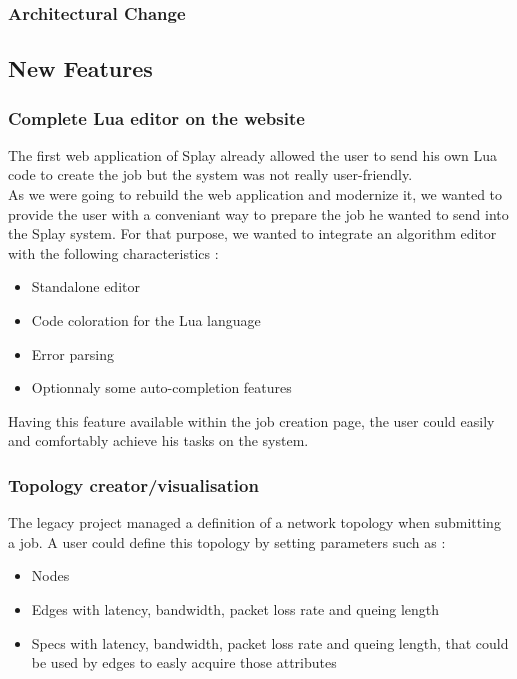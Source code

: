 \documentclass{eplmastersthesis}
\begin{document}
        \subsubsection{Architectural Change}




      \subsection{New Features}

        \subsubsection{Complete Lua editor on the website}

          The first web application of Splay already allowed the user to send
          his own Lua code to create the job but the system was not really
          user-friendly.\\

          As we were going to rebuild the web application and modernize it,
          we wanted to provide the user with a conveniant way to prepare
          the job he wanted to send into the Splay system. For that purpose,
          we wanted to integrate an algorithm editor with the following
          characteristics :

          \begin{itemize}
            \item Standalone editor
            \item Code coloration for the Lua language
            \item Error parsing
            \item Optionnaly some auto-completion features
          \end{itemize}

          Having this feature available within the job creation page, the user
          could easily and comfortably achieve his tasks on the system.

        \subsubsection{Topology creator/visualisation}

          The legacy project managed a definition of a network topology when
          submitting a job. A user could define this topology by setting
          parameters such as :

          \begin{itemize}
            \item Nodes
            \item Edges with latency, bandwidth, packet loss rate and queing
            length
            \item Specs with latency, bandwidth, packet loss rate and queing
            length, that could be used by edges to easly acquire those
            attributes
          \end{itemize}
\end{document}
